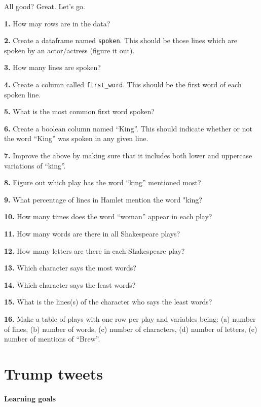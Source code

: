 \documentclass[]{book}
\begin{document}
All good? Great. Let's go.

\textbf{1.} How may rows are in the data?

\textbf{2.} Create a dataframe named \texttt{spoken}. This should be those lines which are spoken by an actor/actress (figure it out).

\textbf{3.} How many lines are spoken?

\textbf{4.} Create a column called \texttt{first\_word}. This should be the first word of each spoken line.

\textbf{5.} What is the most common first word spoken?

\textbf{6.} Create a boolean column named ``King''. This should indicate whether or not the word ``King'' was spoken in any given line.

\textbf{7.} Improve the above by making sure that it includes both lower and uppercase variations of ``king''.

\textbf{8.} Figure out which play has the word ``king'' mentioned most?

\textbf{9.} What percentage of lines in Hamlet mention the word "king?

\textbf{10.} How many times does the word ``woman'' appear in each play?

\textbf{11.} How many words are there in all Shakespeare plays?

\textbf{12.} How many letters are there in each Shakespeare play?

\textbf{13.} Which character says the most words?

\textbf{14.} Which character says the least words?

\textbf{15.} What is the lines(s) of the character who says the least words?

\textbf{16.} Make a table of plays with one row per play and variables being: (a) number of lines, (b) number of words, (c) number of characters, (d) number of letters, (e) number of mentions of ``Brew''.

\hypertarget{trump}{%
\chapter{Trump tweets}\label{trump}}

\hypertarget{learning-goals-23}{%
\subsubsection*{Learning goals}\label{learning-goals-23}}
\end{document}
